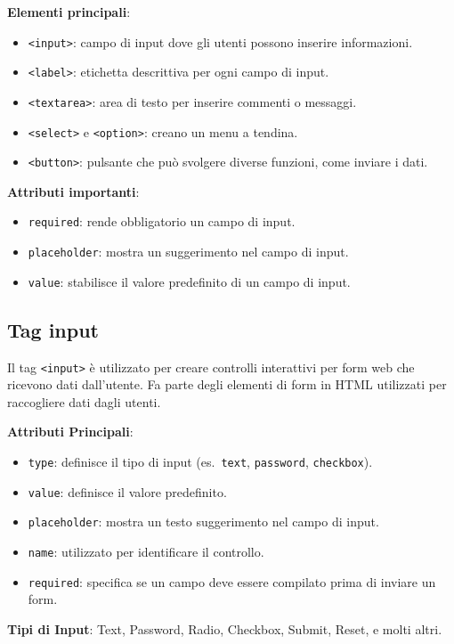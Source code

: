 \textbf{Elementi principali}:
\begin{itemize}
    \item \texttt{<input>}: campo di input dove gli utenti possono inserire informazioni.
    \item \texttt{<label>}: etichetta descrittiva per ogni campo di input.
    \item \texttt{<textarea>}: area di testo per inserire commenti o messaggi.
    \item \texttt{<select>} e \texttt{<option>}: creano un menu a tendina.
    \item \texttt{<button>}: pulsante che può svolgere diverse funzioni, come inviare i dati.
\end{itemize}

\textbf{Attributi importanti}:
\begin{itemize}
    \item \texttt{required}: rende obbligatorio un campo di input.
    \item \texttt{placeholder}: mostra un suggerimento nel campo di input.
    \item \texttt{value}: stabilisce il valore predefinito di un campo di input.
\end{itemize}

\subsection{Tag input}

Il tag \texttt{<input>} è utilizzato per creare controlli interattivi per form web che ricevono dati dall'utente. Fa parte degli elementi di form in HTML utilizzati per raccogliere dati dagli utenti.

\textbf{Attributi Principali}:
\begin{itemize}
    \item \texttt{type}: definisce il tipo di input (es.\ \texttt{text}, \texttt{password}, \texttt{checkbox}).
    \item \texttt{value}: definisce il valore predefinito.
    \item \texttt{placeholder}: mostra un testo suggerimento nel campo di input.
    \item \texttt{name}: utilizzato per identificare il controllo.
    \item \texttt{required}: specifica se un campo deve essere compilato prima di inviare un form.
\end{itemize}

\textbf{Tipi di Input}: Text, Password, Radio, Checkbox, Submit, Reset, e molti altri.

